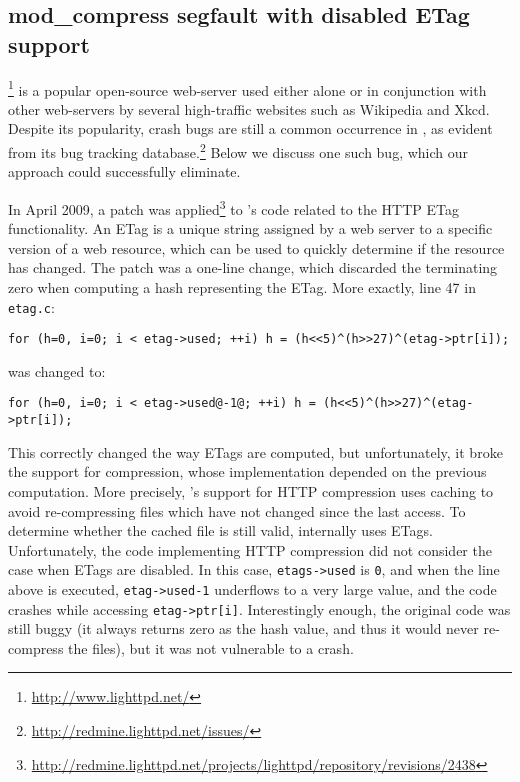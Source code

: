 \subsection{\lighttpd mod\_compress segfault with disabled ETag support}

\lighttpd\footnote{\url{http://www.lighttpd.net/}} is a popular open-source 
web-server used either alone or in conjunction with other web-servers
by several high-traffic websites such as Wikipedia and Xkcd.
Despite its popularity, crash bugs are still a common
occurrence in \lighttpd, as evident from its bug tracking
database.\footnote{\url{http://redmine.lighttpd.net/issues/}}  Below
we discuss one such bug, which our approach could successfully
eliminate.

In April 2009, a patch was
applied\footnote{\url{http://redmine.lighttpd.net/projects/lighttpd/repository/revisions/2438}}
to \lighttpd's code related to the HTTP ETag functionality.  An ETag
is a unique string assigned by a web server to a specific version of a
web resource, which can be used to quickly determine if the resource
has changed.  The patch was a one-line change, which discarded the
terminating zero when computing a hash representing the ETag.  More
exactly, line 47 in \texttt{etag.c}:

\begin{lstlisting}[numbers=none,breaklines=true,xleftmargin=0pt]
for (h=0, i=0; i < etag->used; ++i) h = (h<<5)^(h>>27)^(etag->ptr[i]);
\end{lstlisting}
\noindent was changed to:
\begin{lstlisting}[numbers=none,breaklines=true,xleftmargin=0pt]
for (h=0, i=0; i < etag->used@-1@; ++i) h = (h<<5)^(h>>27)^(etag->ptr[i]);
\end{lstlisting}

This correctly changed the way ETags are computed, but unfortunately,
it broke the support for compression, whose implementation depended on
the previous computation.  More precisely, \lighttpd's support for HTTP
compression uses caching to avoid re-compressing files which have not
changed since the last access.  To determine whether the cached
file is still valid, \lighttpd internally uses ETags.  Unfortunately,
the code implementing HTTP compression did not consider the case when
ETags are disabled.  In this case, \lstinline`etags->used`
is \lstinline`0`, and when the line above is
executed, \lstinline`etag->used-1` underflows to a very large value, and
the code crashes while accessing \lstinline`etag->ptr[i]`.
Interestingly enough, the original code was still buggy (it always
returns zero as the hash value, and thus it would never re-compress
the files), but it was not vulnerable to a crash.


